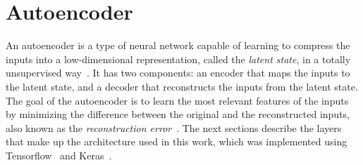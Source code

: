 \begin{table}
\centering
{}
\caption{Activation details for each appliance.}
\label{tab:activation_details}
\end{table}

\section{Autoencoder}

An autoencoder is a type of neural network capable of learning to compress the inputs into a low-dimensional representation, called the \textit{latent state}, in a totally unsupervised way~\parencite{hinton_reducing_2006}. It has two components: an encoder that maps the inputs to the latent state, and a decoder that reconstructs the inputs from the latent state. The goal of the autoencoder is to learn the most relevant features of the inputs by minimizing the difference between the original and the reconstructed inputs, also known as the \textit{reconstruction error}~\parencite{hinton_reducing_2006}. The next sections describe the layers that make up the architecture used in this work, which was implemented using Tensorflow~\parencite{abadi_tensorflow_2016,tensorflow_developers_tensorflow_2023} and Keras~\parencite{chollet_keras_2015}.

